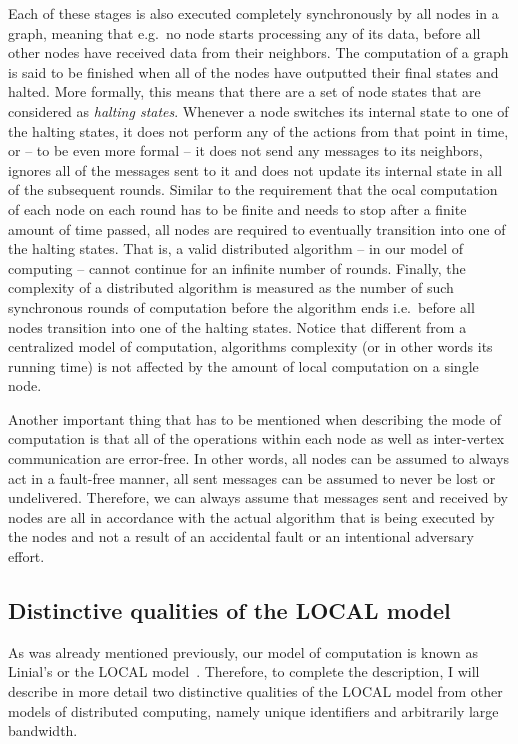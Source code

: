 Each of these stages is also executed
completely synchronously by all nodes in a graph, meaning that e.g.\ no node starts processing
any of its data, before all other nodes have received data from their neighbors. The computation
of a graph is said to be finished when all of the nodes have outputted their final states
and halted. More formally, this means that there are a set of node states that are
considered as \emph{halting states}. Whenever a node switches its internal state to one of the 
halting states, it does not perform any of the actions from that point in time, or -- to
be even more formal -- it does not send any messages to its neighbors, ignores all of the 
messages sent to it and does not update its internal state in all of the subsequent rounds.
Similar to the requirement that the ocal computation of each node on each round has to be finite
and needs to stop after a finite amount of time passed, all nodes are required to eventually
transition into one of the halting states. That is, a valid distributed algorithm -- in our model of
computing -- cannot continue for an infinite number of rounds. Finally,
the complexity of a distributed algorithm is measured as the number of such synchronous rounds
of computation before the algorithm ends i.e.\ before all nodes transition into one of 
the halting states. Notice that different from a centralized model of computation,
algorithms complexity (or in other words its running time) is not affected by the
amount of local computation on a single node.

Another important thing that has to be mentioned when describing the mode of computation
is that all of the operations within each node as well as inter-vertex
communication are error-free. In other words, all nodes can be assumed to
always act in a fault-free manner, all sent messages can be assumed to never be lost
or undelivered. Therefore, we can always assume that messages sent and received by nodes
are all in accordance with the actual algorithm that is being executed by the nodes
and not a result of an accidental fault or an intentional adversary effort.

\subsection{Distinctive qualities of the LOCAL model}

As was already mentioned previously, our model of computation is known
as Linial's or the LOCAL model~\cite{Linial1987}. Therefore, to complete the
description, I will describe in more detail two distinctive qualities of the LOCAL model
from other models of distributed computing, namely unique identifiers and arbitrarily large
bandwidth.

